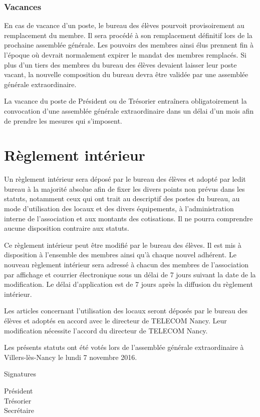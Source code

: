 \documentclass{article}
\begin{document}
			\subsubsection{Vacances}
				En cas de vacance d'un poste, le bureau des élèves pourvoit
				provisoirement au remplacement du membre. Il sera procédé à son
				remplacement définitif lors de la prochaine assemblée générale.
				Les pouvoirs des membres ainsi élus prennent fin à l’époque où
				devrait normalement expirer le mandat des membres remplacés. Si
				plus d’un tiers des membres du bureau des élèves devaient
				laisser leur poste vacant, la nouvelle composition du bureau
				devra être validée par une assemblée générale extraordinaire.

				La vacance du poste de Président ou de Trésorier entraînera
				obligatoirement la convocation d’une assemblée générale
				extraordinaire dans un délai d’un mois afin de prendre les
				mesures qui s’imposent.

	\section{Règlement intérieur}
		Un règlement intérieur sera déposé par le bureau des élèves et adopté
		par ledit bureau à la majorité absolue afin de fixer les divers points
		non prévus dans les statuts, notamment ceux qui ont trait au descriptif
		des postes du bureau, au mode d’utilisation des locaux et des divers
		équipements, à l’administration interne de l’association et aux montants
		des cotisations. Il ne pourra comprendre aucune disposition contraire
		aux statuts.

		Ce règlement intérieur peut être modifié par le bureau des élèves. Il
		est mis à disposition à l’ensemble des membres ainsi qu’à chaque nouvel
		adhérent. Le nouveau règlement intérieur sera adressé à chacun des
		membres de l'association par affichage et courrier électronique sous un
		délai de 7 jours suivant la date de la modification. Le délai
		d’application est de 7 jours après la diffusion du règlement intérieur.

		Les articles concernant l’utilisation des locaux seront déposés par le
		bureau des élèves et adoptés en accord avec le directeur de TELECOM
		Nancy. Leur modification nécessite l’accord du directeur de TELECOM
		Nancy.

	\vspace*{5cm}
	\begin{center}
		{\large\light Les présents statuts ont été votés lors de l’assemblée
		générale extraordinaire à Villers-lès-Nancy le lundi 7 novembre 2016.}
	\end{center}
    \vspace{3cm}
	Signatures\par
	\begin{multicols}{3}
	    \begin{center}
	        Président \\
	        Trésorier \\
	        Secrétaire
	    \end{center}
	\end{multicols}
    
\end{document}
